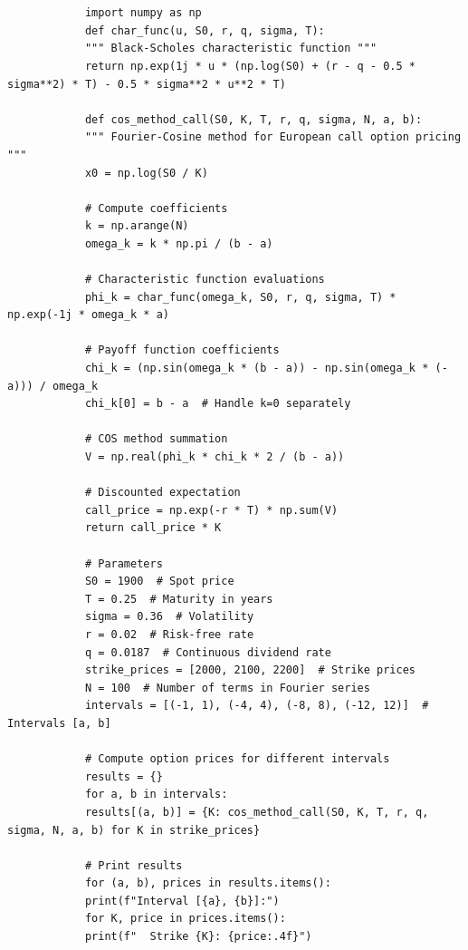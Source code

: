 \documentclass[margin=1in]{article}
\begin{document}
		 \begin{lstlisting}
		
   	    
   	        import numpy as np
   	        def char_func(u, S0, r, q, sigma, T):
   	        """ Black-Scholes characteristic function """
   	        return np.exp(1j * u * (np.log(S0) + (r - q - 0.5 * sigma**2) * T) - 0.5 * sigma**2 * u**2 * T)
   	        
   	        def cos_method_call(S0, K, T, r, q, sigma, N, a, b):
   	        """ Fourier-Cosine method for European call option pricing """
   	        x0 = np.log(S0 / K)
   	        
   	        # Compute coefficients
   	        k = np.arange(N)
   	        omega_k = k * np.pi / (b - a)
   	        
   	        # Characteristic function evaluations
   	        phi_k = char_func(omega_k, S0, r, q, sigma, T) * np.exp(-1j * omega_k * a)
   	        
   	        # Payoff function coefficients
   	        chi_k = (np.sin(omega_k * (b - a)) - np.sin(omega_k * (-a))) / omega_k
   	        chi_k[0] = b - a  # Handle k=0 separately
   	        
   	        # COS method summation
   	        V = np.real(phi_k * chi_k * 2 / (b - a))
   	        
   	        # Discounted expectation
   	        call_price = np.exp(-r * T) * np.sum(V)
   	        return call_price * K
   	        
   	        # Parameters
   	        S0 = 1900  # Spot price
   	        T = 0.25  # Maturity in years
   	        sigma = 0.36  # Volatility
   	        r = 0.02  # Risk-free rate
   	        q = 0.0187  # Continuous dividend rate
   	        strike_prices = [2000, 2100, 2200]  # Strike prices
   	        N = 100  # Number of terms in Fourier series
   	        intervals = [(-1, 1), (-4, 4), (-8, 8), (-12, 12)]  # Intervals [a, b]
   	        
   	        # Compute option prices for different intervals
   	        results = {}
   	        for a, b in intervals:
   	        results[(a, b)] = {K: cos_method_call(S0, K, T, r, q, sigma, N, a, b) for K in strike_prices}
   	        
   	        # Print results
   	        for (a, b), prices in results.items():
   	        print(f"Interval [{a}, {b}]:")
   	        for K, price in prices.items():
   	        print(f"  Strike {K}: {price:.4f}")
   	    
   \end{lstlisting}
		
    
	
\end{document}
